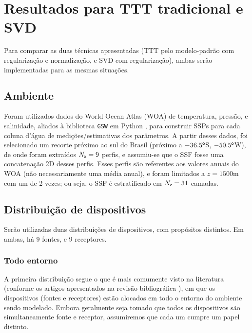 \section{Resultados para TTT tradicional e SVD}
\label{sec:simulation_and_results}
\def\sympathlayer{optimal-import--sweep/optimal-import--sweep--260519-16h08m06s--layer}
\def\sympathsurround{optimal-import--sweep/optimal-import--sweep--260519-16h07m15s--surround}
\def\sympath{\sympathlayer}


Para comparar as duas técnicas apresentadas (TTT pelo modelo-padrão com regularização e normalização, e SVD com regularização), ambas serão implementadas para as mesmas situações.

\subsection{Ambiente} %


Foram utilizados dados do World Ocean Atlas (WOA) \cite{garcia_world_2024} de temperatura, pressão, e salinidade, aliados à biblioteca \texttt{GSW} em Python \cite{mcdougall_getting_2011}, para construir SSPs para cada coluna d'água de medições/estimativas dos parâmetros. A partir desses dados, foi selecionado um recorte próximo ao sul do Brasil (próximo a $-36.5^{{\textsf{o}}}$S, $-50.5^{{\textsf{o}}}$W), de onde foram extraídos $N_{{\textsf{x}}} = 9$ perfis, e assumiu-se que o SSF fosse uma concatenação 2D desses perfis. Esses perfis são referentes aos valores anuais do WOA (não necessariamente uma média anual), e foram limitados a $z = 1500\si{\meter}$ com um  de 2 vezes; ou seja, o SSF é estratificado em $N_{{\textsf{z}}} = 31$ camadas.



\subsection{Distribuição de dispositivos}
\label{subsec:sec3:distribuicao_dispositivos}

Serão utilizadas duas distribuições de dispositivos, com propósitos distintos. Em ambas, há 9 fontes, e 9 receptores.

\subsubsection*{Todo entorno}

A primeira distribuição segue o que é mais comumente visto na literatura (conforme os artigos apresentados na revisão bibliográfica \cite{revisao_bibliografica}), em que os dispositivos (fontes e receptores) estão alocados em todo o entorno do ambiente sendo modelado. Embora geralmente seja tomado que todos os dispositivos são simultaneamente fonte e receptor, assumiremos que cada um cumpre um papel distinto.

